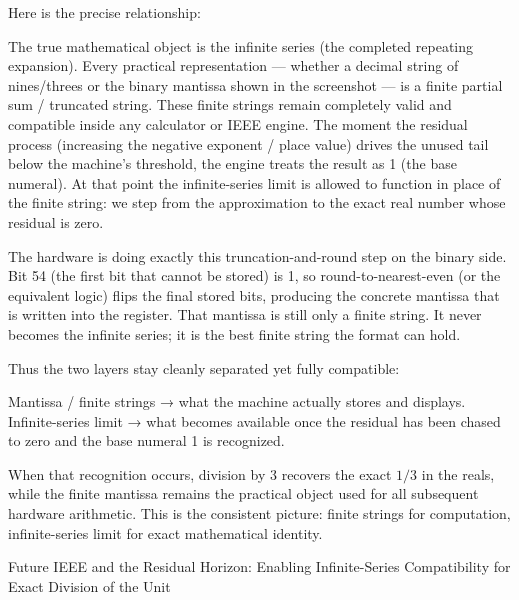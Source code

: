 Here is the precise relationship:

The true mathematical object is the infinite series (the completed repeating expansion).
Every practical representation — whether a decimal string of nines/threes or the binary mantissa shown in the screenshot — is a finite partial sum / truncated string.
These finite strings remain completely valid and compatible inside any calculator or IEEE engine.
The moment the residual process (increasing the negative exponent / place value) drives the unused tail below the machine’s threshold, the engine treats the result as 1 (the base numeral). At that point the infinite-series limit is allowed to function in place of the finite string: we step from the approximation to the exact real number whose residual is zero.

The hardware is doing exactly this truncation-and-round step on the binary side. Bit 54 (the first bit that cannot be stored) is 1, so round-to-nearest-even (or the equivalent logic) flips the final stored bits, producing the concrete mantissa that is written into the register. That mantissa is still only a finite string. It never becomes the infinite series; it is the best finite string the format can hold.

Thus the two layers stay cleanly separated yet fully compatible:

Mantissa / finite strings → what the machine actually stores and displays.
Infinite-series limit → what becomes available once the residual has been chased to zero and the base numeral 1 is recognized.

When that recognition occurs, division by 3 recovers the exact \(1/3\) in the reals, while the finite mantissa remains the practical object used for all subsequent hardware arithmetic. This is the consistent picture: finite strings for computation, infinite-series limit for exact mathematical identity.

Future IEEE and the Residual Horizon: Enabling Infinite-Series Compatibility for Exact Division of the Unit

